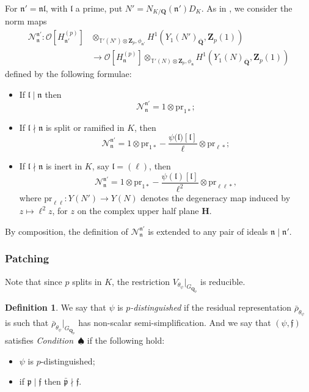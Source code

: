 \documentclass[10pt,letterpaper]{amsart}
\theoremstyle{plain}
\theoremstyle{definition}
\newtheorem{defn}[thm]{Definition}
\theoremstyle{definition}
\theoremstyle{plain}
\theoremstyle{plain}
\theoremstyle{plain}
\theoremstyle{remark}
\numberwithin{equation}{section}
\newcommand{\pp}{\mathfrak{p}}
\newcommand{\ppbar}{\bar{\mathfrak{p}}}
\newcommand{\fkf}{\mathfrak{f}}
\newcommand{\fkl}{\mathfrak{l}}
\newcommand{\fkn}{\mathfrak{n}}
\DeclareMathOperator{\et}{\acute{e}t}
\newcommand{\bQ}{\mathbf{Q}}
\newcommand{\Q}{\mathbf{Q}}
\newcommand{\Z}{\mathbf{Z}}
\begin{document}
For $\fkn'=\fkn\fkl$, with $\fkl$ a prime, put $N'=N_{K/\Q}(\fkn')D_K$. As in \cite[\S{3.3}]{LLZ-K}, we consider the norm maps
\begin{equation}\begin{aligned}
    \mathcal{N}_{\fkn}^{\fkn'}:\mathcal{O}[H_{\fkn'}^{(p)}]&\otimes_{\mathbb{T}'(N')\otimes\Z_p,\phi_{\fkn'}}H^1_{\et}(Y_1(N')_{\overline{\Q}},\Z_p(1))\\ &\rightarrow \mathcal{O}[H_{\fkn}^{(p)}]\otimes_{\mathbb{T}'(N)\otimes\Z_p,\phi_{\fkn}}H^1_{\et}(Y_1(N)_{\overline{\Q}},\Z_p(1))
\end{aligned}
\nonumber
\end{equation}
defined by the following formulae: 
\begin{itemize}
    \item If $\fkl\mid\fkn$ then 
    \begin{equation*}
        \mathcal{N}_{\fkn}^{\fkn'}=1\otimes \text{pr}_{1*};
    \end{equation*}
    \item If $\fkl\nmid\fkn$ is split or ramified in $K$, then 
    \begin{equation*}
        \mathcal{N}_{\fkn}^{\fkn'}=1\otimes \text{pr}_{1*}-\frac{\psi(\mathfrak{l)}[\fkl]}{\ell}\otimes \text{pr}_{\ell*};
    \end{equation*}
    \item If $\fkl\nmid\fkn$ is inert in $K$, say $\fkl=(\ell)$, then 
    \begin{equation*}
        \mathcal{N}_{\fkn}^{\fkn'}=1\otimes \text{pr}_{1*}-\frac{\psi(\fkl)[\fkl]}{\ell^2}\otimes \text{pr}_{\ell\ell*},
    \end{equation*}
    where ${\mathrm{pr}}_{\ell\ell}:Y(N')\rightarrow Y(N)$ denotes the degeneracy map induced by $z\mapsto\ell^2z$, for $z$ on the complex upper half plane $\mathbf{H}$.
\end{itemize}
By composition, the definition of $\mathcal{N}_{\fkn}^{\fkn'}$ is extended to any pair of ideals $\fkn\mid\fkn'$.

\subsubsection{Patching}

Note that since $p$ splits in $K$, the restriction $V_{\theta_\psi}\vert_{G_{\bQ_p}}$ is reducible.

\begin{defn}\label{def:psi-dist}
We say that $\psi$ is \emph{$p$-distinguished} if the residual representation $\bar{\rho}_{\theta_\psi}$ is such that $\bar{\rho}_{\theta_\psi}\vert_{G_{\Q_p}}$ has non-scalar semi-simplification. And we say that $(\psi,\fkf)$ satisfies \emph{Condition~$\spadesuit$} if the following hold:
\begin{itemize}
\item $\psi$ is $p$-distinguished;
\item if $\pp\mid\fkf$ then $\ppbar\nmid\fkf$.
\end{itemize}
\end{defn}
\end{document}
